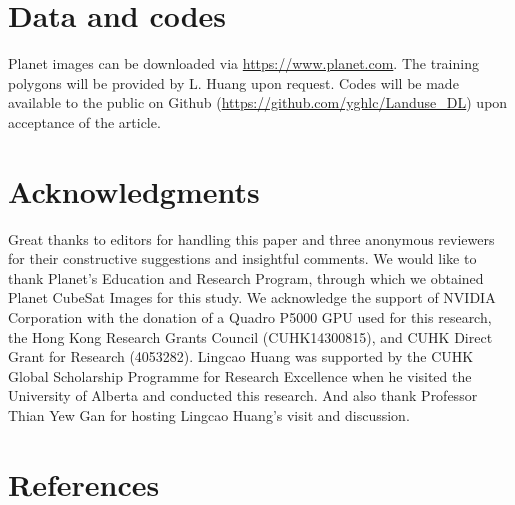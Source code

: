 \documentclass[authoryear,preprint,review,12pt]{elsarticle}
\begin{document}
\section{Data and codes}
\label{sec_data_codes}

Planet images can be downloaded via \url{https://www.planet.com}. The training polygons will be provided by L. Huang upon request. 
Codes will be made available to the public on Github (\url{https://github.com/yghlc/Landuse\_DL}) upon acceptance of the article. 


\section{Acknowledgments}
\label{sec_acknowledgments}

Great thanks to editors for handling this paper and three anonymous reviewers for their constructive suggestions and insightful comments.
We would like to thank Planet’s Education and Research Program, through which we obtained Planet CubeSat Images for this study. We acknowledge the support of NVIDIA Corporation with the donation of a Quadro P5000 GPU used for this research, the Hong Kong Research Grants Council (CUHK14300815), and CUHK Direct Grant for Research (4053282). Lingcao Huang was supported by the CUHK Global Scholarship Programme for Research Excellence when he visited the University of Alberta and conducted this research. 
And also thank Professor Thian Yew Gan for hosting Lingcao Huang's visit and discussion.





\section{References}
\label{sec_reference}

 



%
%
\end{document}
